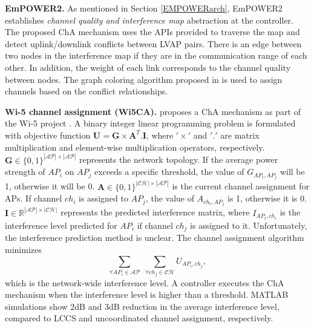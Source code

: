 \textbf{EmPOWER2.}
\label{EMPOWER2ChA}
As mentioned in Section \ref{EMPOWERarch}, EmPOWER2 \cite{Primitives} establishes \textit{channel quality and interference map} abstraction at the controller.
The proposed ChA mechanism uses the APIs provided to traverse the map and detect uplink/downlink conflicts between LVAP pairs.
There is an edge between two nodes in the interference map if they are in the communication range of each other.
In addition, the weight of each link corresponds to the channel quality between nodes.
The graph coloring algorithm proposed in \cite{san2012new} is used to assign channels based on the conflict relationships.



\label{Wi5CM}
\textbf{Wi-5 channel assignment (Wi5CA).} 
\cite{DCA-2} proposes a ChA mechanism as part of the Wi-5 project \cite{Wi-5}.
A binary integer linear programming problem is formulated with objective function 
$\textbf{U} = \textbf{G}\times \textbf{A}^{T} . \textbf{I}$, 
where $'\times'$ and $'.'$ are matrix multiplication and element-wise multiplication operators, respectively. $\textbf{G}\in\{0,1\}^{|\mathcal{AP}| \times |\mathcal{AP}|}$ represents the network topology. 
If the average power strength of $AP_i$ on $AP_j$ exceeds a specific threshold, the value of $G_{AP_{i}, AP_{j}}$ will be 1, otherwise it will be 0. $\textbf{A}\in\{0,1\}^{|\mathcal{CH}|\times |\mathcal{AP}|}$ is the current channel assignment for APs.
If channel $ch_i$ is assigned to $AP_j$, the value of $A_{{ch_{i},AP_{j}}}$ is 1, otherwise it is 0. 
$\textbf{I}\in \mathbb{R} ^{|\mathcal{AP}| \times |\mathcal{CH}|}$ represents the predicted interference matrix, where $I_{AP_{i}, ch_{i}}$ is the interference level predicted for $AP_i$ if channel $ch_j$ is assigned to it.
Unfortunately, the interference prediction method is unclear.  
The channel assignment algorithm minimizes 
\begin{equation}
\sum_{\forall AP_{i} \in \mathcal{AP}}\;\sum_{\forall ch_{j} \in \mathcal{CH}} U_{AP_{i}, ch_{j}}, 
\end{equation}
which is the network-wide interference level.
A controller executes the ChA mechanism when the interference level is higher than a threshold.
MATLAB simulations show 2dB and 3dB reduction in the average interference level, compared to LCCS and uncoordinated channel assignment, respectively.


